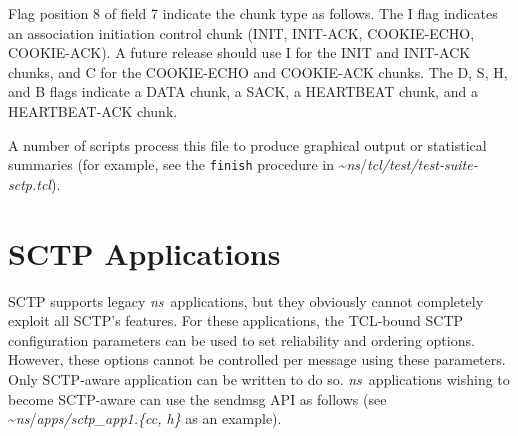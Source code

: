       Flag position 8 of field 7 indicate the chunk type as follows. The
      {\sf I} flag indicates an association initiation control chunk
      (INIT, INIT-ACK, COOKIE-ECHO, COOKIE-ACK). A future release should
      use {\sf I} for the INIT and INIT-ACK chunks, and {\sf C} for the
      COOKIE-ECHO and COOKIE-ACK chunks. The {\sf D}, {\sf S}, {\sf H},
      and {\sf B} flags indicate a DATA chunk, a SACK, a HEARTBEAT chunk,
      and a HEARTBEAT-ACK chunk.

      A number of scripts process this file to produce graphical output or
      statistical summaries (for example, see the {\tt finish} procedure
      in \textasciitilde\emph{ns}/{\em{tcl/test/test-suite-sctp.tcl}}).

   \section{SCTP Applications}
   \label{sec:sctpApps}

      SCTP supports legacy \emph{ns}~applications, but they obviously cannot
      completely exploit all SCTP's features. For these applications, the
      TCL-bound SCTP configuration parameters can be used to set
      reliability and ordering options. However, these options cannot be
      controlled per message using these parameters. Only SCTP-aware
      application can be written to do so. \emph{ns}~applications wishing to
      become SCTP-aware can use the sendmsg API as follows (see
      \textasciitilde\emph{ns}/{\em{apps/sctp\_app1.\{cc, h\}}} as an example).

